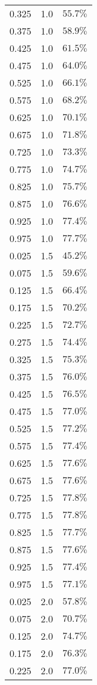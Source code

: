 \begin{longtable}{rrr}
0.325 & 1.0 & $55.7\%$ \\ 
0.375 & 1.0 & $58.9\%$ \\ 
0.425 & 1.0 & $61.5\%$ \\ 
0.475 & 1.0 & $64.0\%$ \\ 
0.525 & 1.0 & $66.1\%$ \\ 
0.575 & 1.0 & $68.2\%$ \\ 
0.625 & 1.0 & $70.1\%$ \\ 
0.675 & 1.0 & $71.8\%$ \\ 
0.725 & 1.0 & $73.3\%$ \\ 
0.775 & 1.0 & $74.7\%$ \\ 
0.825 & 1.0 & $75.7\%$ \\ 
0.875 & 1.0 & $76.6\%$ \\ 
0.925 & 1.0 & $77.4\%$ \\ 
0.975 & 1.0 & $77.7\%$ \\ 
0.025 & 1.5 & $45.2\%$ \\ 
0.075 & 1.5 & $59.6\%$ \\ 
0.125 & 1.5 & $66.4\%$ \\ 
0.175 & 1.5 & $70.2\%$ \\ 
0.225 & 1.5 & $72.7\%$ \\ 
0.275 & 1.5 & $74.4\%$ \\ 
0.325 & 1.5 & $75.3\%$ \\ 
0.375 & 1.5 & $76.0\%$ \\ 
0.425 & 1.5 & $76.5\%$ \\ 
0.475 & 1.5 & $77.0\%$ \\ 
0.525 & 1.5 & $77.2\%$ \\ 
0.575 & 1.5 & $77.4\%$ \\ 
0.625 & 1.5 & $77.6\%$ \\ 
0.675 & 1.5 & $77.6\%$ \\ 
0.725 & 1.5 & $77.8\%$ \\ 
0.775 & 1.5 & $77.8\%$ \\ 
0.825 & 1.5 & $77.7\%$ \\ 
0.875 & 1.5 & $77.6\%$ \\ 
0.925 & 1.5 & $77.4\%$ \\ 
0.975 & 1.5 & $77.1\%$ \\ 
0.025 & 2.0 & $57.8\%$ \\ 
0.075 & 2.0 & $70.7\%$ \\ 
0.125 & 2.0 & $74.7\%$ \\ 
0.175 & 2.0 & $76.3\%$ \\ 
0.225 & 2.0 & $77.0\%$ \\ 

\end{longtable}
